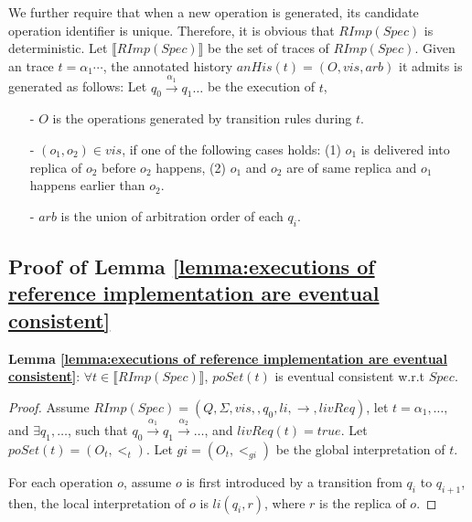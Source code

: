 {We further require that when a new operation is generated, its candidate operation identifier is unique. Therefore, it is obvious that $RImp(Spec)$ is deterministic. Let $\llbracket RImp(Spec) \rrbracket$ be the set of traces of $RImp(Spec)$. Given an trace $ t= \alpha_1 \cdots$, the annotated history  $anHis(t) = (O,\mathit{vis},\mathit{arb})$ it admits is generated as follows: Let $q_0 {\xrightarrow{\alpha_1}} q_1 \ldots$ be the execution of $t$,

\begin{itemize}
\setlength{\itemsep}{0.5pt}
\item[-] $O$ is the operations generated by transition rules during $t$.

\item[-] $(o_1,o_2) \in \mathit{vis}$, if one of the following cases holds: (1) $o_1$ is delivered into replica of $o_2$ before $o_2$ happens, (2) $o_1$ and $o_2$ are of same replica and $o_1$ happens earlier than $o_2$.

\item[-] $\mathit{arb}$ is the union of arbitration order of each $q_i$.
\end{itemize}



\subsection{Proof of Lemma \ref{lemma:executions of reference implementation are eventual consistent}}
\label{subsec:appendix proof of lemma executions of reference implementation are eventual consistent}

{\noindent \bf Lemma \ref{lemma:executions of reference implementation are eventual consistent}}: $\forall t \in \llbracket RImp(Spec) \rrbracket$, $poSet(t)$ is eventual consistent w.r.t $Spec$.

\begin {proof}

Assume $RImp(Spec) = (Q,\Sigma,vis,,q_0,li,\rightarrow,livReq)$, let $t = \alpha_1, \ldots, $ and $\exists q_1,\ldots$, such that $q_0 {\xrightarrow{\alpha_1}} q_1 {\xrightarrow{\alpha_2}} \ldots$, and $livReq(t) = \mathit{true}$. Let $poSet(t)=(O_t,<_t)$. Let $gi = (O_t,<_{gi})$ be the global interpretation of $t$.

For each operation $o$, assume $o$ is first introduced by a transition from $q_i$ to $q_{i+1}$, then, the local interpretation of $o$ is $li(q_i,r)$, where $r$ is the replica of $o$.


\end{proof}}
